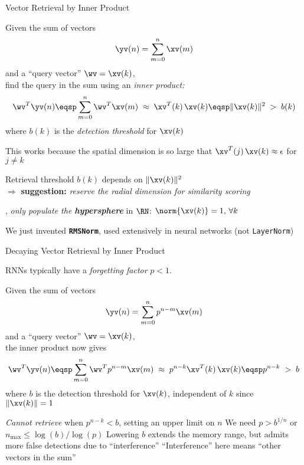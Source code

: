 \begin{slide}[\slideopts,toc={Inner Product}]{Vector Retrieval by Inner Product}

  Given the sum of vectors
  \[
  \yv(n) = \sum_{m=0}^n \xv(m)
  \]
  and a ``query vector'' $\wv = \xv(k)$,\\
  \maybepause
  find the query in the sum using an \emph{inner product:}
  \[
  \wv^T\yv(n) \eqsp \sum_{m=0}^n \wv^T\xv(m) \;\approx\; \xv^T(k)\,\xv(k) \eqsp \|\xv(k)\|^2 \;>\; b(k)
  \]
  where $b(k)$ is the \emph{detection threshold} for $\xv(k)$

  \begin{itemize}
  \mpitem This works because the spatial dimension is so large that $\xv^T(j)\,\xv(k)\approx \epsilon$ for $j\ne k$

  \mpitem Retrieval threshold $b(k)$ depends on $\|\xv(k)\|^2$\\
  $\Rightarrow$ \textbf{suggestion:} \emph{reserve the radial dimension for similarity scoring}

  \mpitem \Ie, \emph{only populate the \textbf{hypersphere}} in $\RN$: $\norm{\xv(k)} = 1, \, \forall k$

  \mpitem We just invented \textbf{\texttt{RMSNorm}}, used extensively in neural networks (not \texttt{LayerNorm})

  \end{itemize}

\end{slide}

\begin{slide}[\slideopts,toc={}]{Decaying Vector Retrieval by Inner Product}

  RNNs typically have a \emph{forgetting factor} $p<1$.

  Given the sum of vectors
  \[
  \yv(n) = \sum_{m=0}^n p^{n-m}\xv(m)
  \]
  and a ``query vector'' $\wv = \xv(k)$,\\
  \maybepause
  the inner product now gives
  \[
  \wv^T\yv(n) \eqsp \sum_{m=0}^n \wv^Tp^{n-m}\xv(m) \;\approx\; p^{n-k}\xv^T(k)\,\xv(k) \eqsp p^{n-k} \;>\; b
  \]
  where $b$ is the detection threshold for $\xv(k)$, independent of $k$ since $\|\xv(k)\|=1$

  \begin{itemize}
  \mpitem \emph{Cannot retrieve} when $p^{n-k} < b$, setting an upper limit on $n$
  \mpitem We need $p > b^{1/n}$ or $n_{\mbox{max}} \le \log(b)/\log(p)$
  \mpitem Lowering $b$ extends the memory range, but admits more false detections due to ``interference''
  \mpitem ``Interference'' here means ``other vectors in the sum''
  \end{itemize}

\end{slide}

